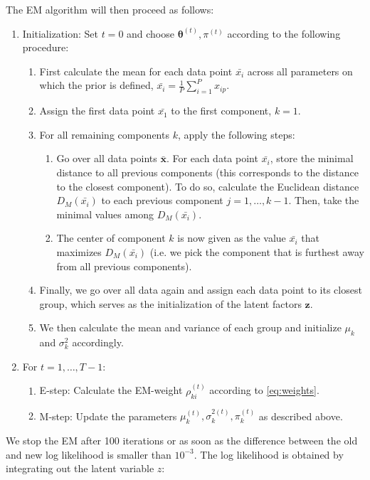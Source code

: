 \documentclass[a4paper,11pt]{article}
\def\x{\boldsymbol{x}}
\def\z{\boldsymbol{z}}
\def\btheta{\boldsymbol{\theta}}
\begin{document}
The EM algorithm will then proceed as follows:
\begin{enumerate}
   \item Initialization: Set $t=0$ and choose $\btheta^{(t)}, \pi^{(t)}$ according to the following procedure:
   \begin{enumerate}
    \item First calculate the mean for each data point $\bar{x_i}$ across all parameters on which the prior is defined, $\bar{x_i} = \frac{1}{P}\sum_{i=1}^P x_{ip}$.
    \item Assign the first data point $\bar{x_1}$ to the first component, $k=1$.
    \item For all remaining components $k$, apply the following steps:
    \begin{enumerate}
     \item Go over all data points $\bar{\x}$. For each data point $\bar{x_i}$, store the minimal distance to all previous components (this corresponds to the distance to the closest component). To do so, calculate the Euclidean distance $D_M(\bar{x_i})$ to each previous component $j=1, \ldots, k-1$. Then, take the minimal values among $D_M(\bar{x_i})$.
     \item The center of component $k$ is now given as the value $\bar{x_i}$ that maximizes $D_M(\bar{x_i})$ (i.e. we pick the component that is furthest away from all previous components).
    \end{enumerate}
    \item Finally, we go over all data again and assign each data point to its closest group, which serves as the initialization of the latent factors $\z$.
    \item We then calculate the mean and variance of each group and initialize $\mu_k$ and $\sigma_k^2$ accordingly.
    \end{enumerate}
   \item For $t=1, \ldots, T-1$:
    \begin{enumerate}
        \item E-step: Calculate the EM-weight $\rho_{ki}^{(t)}$ according to \eqref{eq:weights}.

        \item M-step: Update the parameters $\mu_k^{(t)}, \sigma_k^{2(t)}, \pi_k^{(t)}$ as described above.
    \end{enumerate}
\end{enumerate}
We stop the EM after 100 iterations or as soon as the difference between the old and new log likelihood is smaller than $10^{-3}$. The log likelihood is obtained by integrating out the latent variable $z$:
\end{document}
